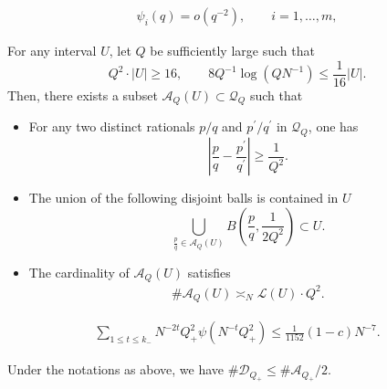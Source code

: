 \documentclass[10pt,a4paper]{amsart}
\begin{document}
\begin{align}\label{condithm1}
\psi_i(q)=o(q^{-2}),
\qquad i=1,\dots,m,
\end{align}

\begin{lem}\label{WDP}For any interval $U$, let $Q$ be sufficiently large such that
        \begin{equation}\label{f1}
        Q^2\cdot|U|\ge 16,\qquad
       {8Q^{-1}\log (QN^{-1})}\le \frac{1}{16}|U|.
        \end{equation} Then, there exists a subset $\mathcal{A}_{Q}(U)\subset \mathcal{Q}_{Q}$ such that
\begin{itemize}
  \item For any two distinct rationals $p/q$ and $p^{\prime}/q^{\prime}$ in $\mathcal{Q}_Q$, one has
   $$\left|\frac{p}{q}-\frac{p^{\prime}}{q^{\prime}}\right|\ge \frac{1}{Q^2}.$$
     \item The union of the following disjoint balls is  contained in $U$
        $$\bigcup_{\frac{p}{q}\in \mathcal{A}_{Q}(U)}B\left(\frac{p}{q},\frac{1}{2Q^2}\right)\subset U.$$
    \item The cardinality of \(\mathcal A_Q(U)\) satisfies
        \begin{align}\label{number}
        \# \mathcal{A}_{Q}(U)\asymp_{N} \mathcal{L}(U)\cdot Q^{2}.
        \end{align}
\end{itemize}
\end{lem}

 \begin{align}\label{lcondi}
    \sum_{1\le t\le k_-}N^{-2t}Q_+^2\psi(N^{-t}Q_+^2)\le \frac{1}{1152}(1-c)N^{-7}.
    \end{align}

\begin{lem}\label{count}
    Under the notations as above, we have $\#\mathcal{D}_{Q_+}\le \#\mathcal{A}_{Q_+} / 2$.
\end{lem}
\end{document}

